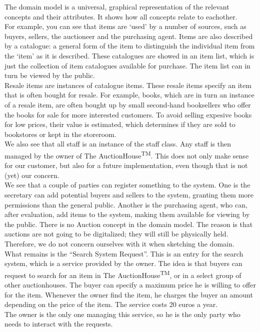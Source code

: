 The domain model is a universal, graphical representation of the relevant concepts and their attributes. It shows how all concepts relate to eachother.\\
For example, you can see that items are `used' by a number of sources, such as buyers, sellers, the auctioneer and the purchasing agent. Items are also described by a catalogue: a general form of the item to distinguish the individual item from the `item' as it is described. These catalogues are showed in an item list, which is just the collection of item catalogues available for purchase. The item list can in turn be viewed by the public.\\
Resale items are instances of catalogue items. These resale items specify an item that is often bought for resale. For example, books, which are in turn an instance of a resale item, are often bought up by small second-hand booksellers who offer the books for sale for more interested customers. To avoid selling expesive books for low prices, their value is estimated, which determines if they are sold to bookstores or kept in the storeroom.\\
We also see that all staff is an instance of the staff class. Any staff is then managed by the owner of The AuctionHouse\textsuperscript{TM}. This does not only make sense for our customer, but also for a future implementation, even though that is not (yet) our concern.\\
We see that a couple of parties can register something to the system. One is the secretary can add potential buyers and sellers to the system, granting them more permissions than the general public. Another is the purchasing agent, who can, after evaluation, add items to the system, making them available for viewing by the public.
There is no Auction concept in the domain model. The reason is that auctions are not going to be digitalized; they will still be physically held. Therefore, we do not concern ourselves with it when sketching the domain.\\
What remains is the ``Search System Request''. This is an entry for the search system, which is a service provided by the owner. The idea is that buyers can request to search for an item in The AuctionHouse\textsuperscript{TM}, or in a select group of other auctionhouses. The buyer can specify a maximum price he is willing to offer for the item. Whenever the owner find the item, he charges the buyer an amount depending on the price of the item. The service costs 20 euros a year.\\
The owner is the only one managing this service, so he is the only party who needs to interact with the requests.